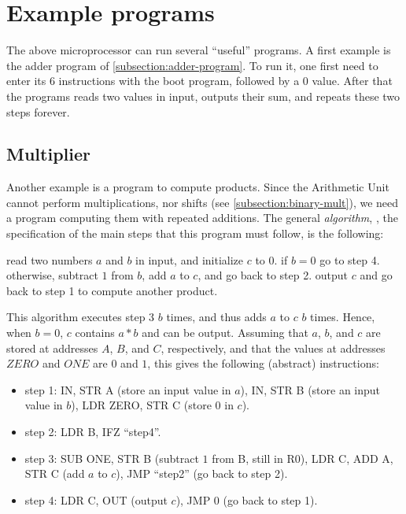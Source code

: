 \section{Example programs}

The above microprocessor can run several ``useful'' programs. A first example
is the adder program of \cref{subsection:adder-program}. To run it, one first
need to enter its $6$ instructions with the boot program, followed by a $0$
value. After that the programs reads two values in input, outputs their sum,
and repeats these two steps forever.

\subsection{Multiplier}

Another example is a program to compute products. Since the Arithmetic Unit
cannot perform multiplications, nor shifts (see \cref{subsection:binary-mult}),
we need a program computing them with repeated additions. The general {\em
algorithm}, \ie, the specification of the main steps that this program must
follow, is the following:

\begin{algorithmic}[1]
\State read two numbers $a$ and $b$ in input, and initialize $c$ to $0$.
\State if $b=0$ go to step 4.
\State otherwise, subtract $1$ from $b$, add $a$ to $c$, and go back to step 2.
\State output $c$ and go back to step 1 to compute another product.
\end{algorithmic}

This algorithm executes step 3 $b$ times, and thus adds $a$ to $c$ $b$ times.
Hence, when $b=0$, $c$ contains $a * b$ and can be output. Assuming that $a$,
$b$, and $c$ are stored at addresses $A$, $B$, and $C$, respectively, and that
the values at addresses $\mathit{ZERO}$ and $\mathit{ONE}$ are $0$ and $1$,
this gives the following (abstract) instructions:
\begin{itemize}
  \item step 1: IN, STR A (store an input value in $a$), IN, STR B (store an
  input value in $b$), LDR ZERO, STR C (store $0$ in $c$).

  \item step 2: LDR B, IFZ ``step4''.

  \item step 3: SUB ONE, STR B (subtract $1$ from B, still in R0), LDR C, ADD
  A, STR C (add $a$ to $c$), JMP ``step2'' (go back to step 2).

  \item step 4: LDR C, OUT (output $c$), JMP 0 (go back to step 1).
\end{itemize}

